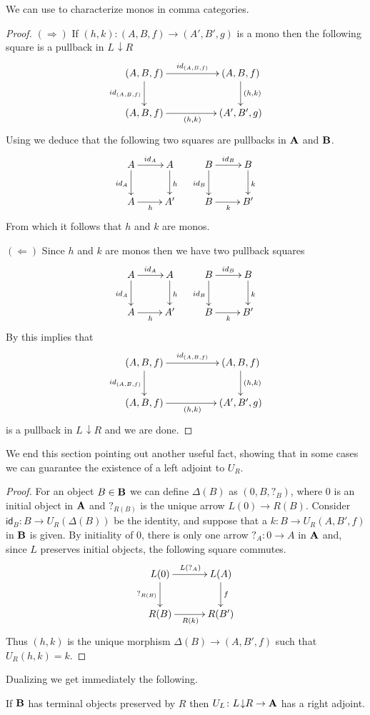 \documentclass[a4paper,UKenglish,cleveref,pdftex,thm-restate,numberwithinsect]{lipics-v2021}
\def\B{\textbf {\textup{B}}}
\def\A{\textbf {\textup{A}}}
\newcommand{\comma}[2]{#1\hspace{1pt} {\downarrow}#2}
\newcommand{\id}[1]{\mathsf{id}_{#1}}
\begin{document}
We can use  to characterize monos in comma categories. 
\begin{proof}
	$(\Rightarrow)$  If $(h,k)\colon (A,B,f)\to (A', B', g)$ is a mono then the following square is a pullback in $\comma{L}{R}$
	\[\xymatrix@C=50pt{(A, B, f)  \ar[r]^{\id{(A,B,f)}} \ar[d]_{\id{(A,B,f)}}& (A, B, f)  \ar[d]^{(h,k)} \\ (A, B, f)  \ar[r]_{(h,k)}& (A', B', g) }\]
	Using  we deduce that the following two squares are pullbacks in $\A$ and $\B$.
	\[\xymatrix{A \ar[r]^{\id{A}} \ar[d]_{\id{A}} & A \ar[d]^{h} & B \ar[r]^{\id{B}} \ar[d]_{\id{B}} & B  \ar[d]^{k}\\ A \ar[r]_{h} & A' & B \ar[r]_{k} & B'}\]
	From which it follows that $h$ and $k$ are monos.
	
	\smallskip\noindent 
	$(\Leftarrow)$ Since $h$ and $k$ are monos then we have two pullback squares 	
	\[\xymatrix{A \ar[r]^{\id{A}} \ar[d]_{\id{A}} & A \ar[d]^{h} & B \ar[r]^{\id{B}} \ar[d]_{\id{B}} & B  \ar[d]^{k}\\ A \ar[r]_{h} & A' & B \ar[r]_{k} & B'}\]
	By  this implies that 
	\[\xymatrix@C=50pt{(A, B, f)  \ar[r]^{\id{(A,B,f)}} \ar[d]_{\id{(A,B,f)}}& (A, B, f)  \ar[d]^{(h,k)} \\ (A, B, f)  \ar[r]_{(h,k)}& (A', B', g) }\]
	is a pullback in $\comma{L}{R}$ and we are done.   
\end{proof}

We end this section pointing out another useful fact,  showing that in some cases we can guarantee  the existence of a left adjoint to $U_R$. 

\begin{proof} For an object $B\in \B$ we can define $\Delta(B)$ as $(0, B, ?_{B})$, where $0$ is an initial object in $\A$ and $?_{R(B)}$ is the unique arrow $L(0)\to R(B)$. Consider $\id{B}\colon B\to U_R(\Delta(B))$ be the identity, and suppose that a $k\colon B\to U_R(A, B', f)$ in $\B$ is given. By initiality of $0$, there is only one arrow $?_A\colon 0\to A $ in $\A$ and, since $L$ preserves initial objects, the following square commutes.
	\[\xymatrix@C=30pt{L(0) \ar[r]^{L(?_A)} \ar[d]_{?_{R(B)}} & L(A) \ar[d]^{f}\\ R(B) \ar[r]_{R(k)}& R(B')}\]
	Thus $(h,k)$ is the unique morphism $\Delta(B)\to (A, B', f)$	such that $U_R(h,k)=k$.   
\end{proof}
Dualizing we get immediately the following.
\begin{corollary}If $\B$ has terminal objects preserved by $R$ then $U_L\colon \comma{L}{R}\to \A$ has a right adjoint.
\end{corollary}
\end{document}
